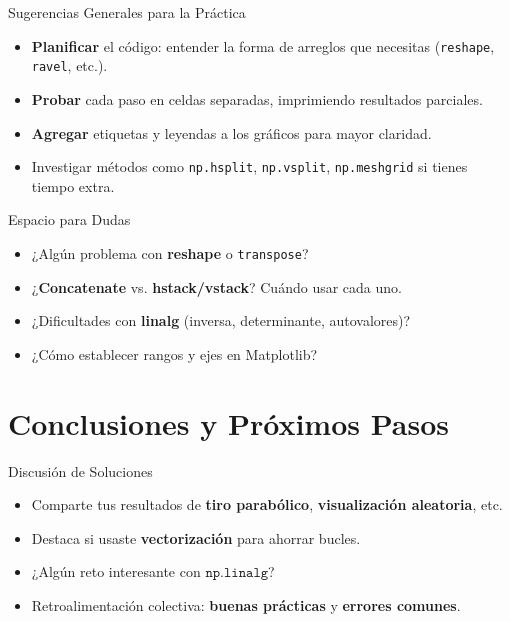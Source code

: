 \documentclass[10pt]{beamer}
\begin{document}
\begin{frame}{Sugerencias Generales para la Práctica}
  \begin{itemize}
    \item \textbf{Planificar} el código: entender la forma de arreglos que necesitas (\texttt{reshape}, \texttt{ravel}, etc.).
    \item \textbf{Probar} cada paso en celdas separadas, imprimiendo resultados parciales.
    \item \textbf{Agregar} etiquetas y leyendas a los gráficos para mayor claridad.
    \item Investigar métodos como \texttt{np.hsplit}, \texttt{np.vsplit}, \texttt{np.meshgrid} si tienes tiempo extra.
  \end{itemize}
\end{frame}

\begin{frame}{Espacio para Dudas}
  \begin{itemize}
    \item ¿Algún problema con \textbf{reshape} o \texttt{transpose}?
    \item ¿\textbf{Concatenate} vs. \textbf{hstack/vstack}? Cuándo usar cada uno.
    \item ¿Dificultades con \textbf{linalg} (inversa, determinante, autovalores)?
    \item ¿Cómo establecer rangos y ejes en Matplotlib?
  \end{itemize}
\end{frame}

\section{Conclusiones y Próximos Pasos}

\begin{frame}{Discusión de Soluciones}
  \begin{itemize}
    \item Comparte tus resultados de \textbf{tiro parabólico}, \textbf{visualización aleatoria}, etc.
    \item Destaca si usaste \textbf{vectorización} para ahorrar bucles.
    \item ¿Algún reto interesante con \(\texttt{np.linalg}\)?
    \item Retroalimentación colectiva: \textbf{buenas prácticas} y \textbf{errores comunes}.
  \end{itemize}
\end{frame}
\end{document}
